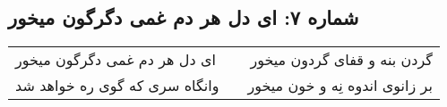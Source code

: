 \begin{center}
\section*{شماره ۷: ای دل هر دم غمی دگرگون میخور}
\label{sec:007}
\begin{longtable}{l p{0.5cm} r}
ای دل هر دم غمی دگرگون میخور
&&
گردن بنه و قفای گردون میخور
\\
وانگاه سری که گوی ره خواهد شد
&&
بر زانوی اندوه نِه و خون میخور
\\
\end{longtable}
\end{center}
